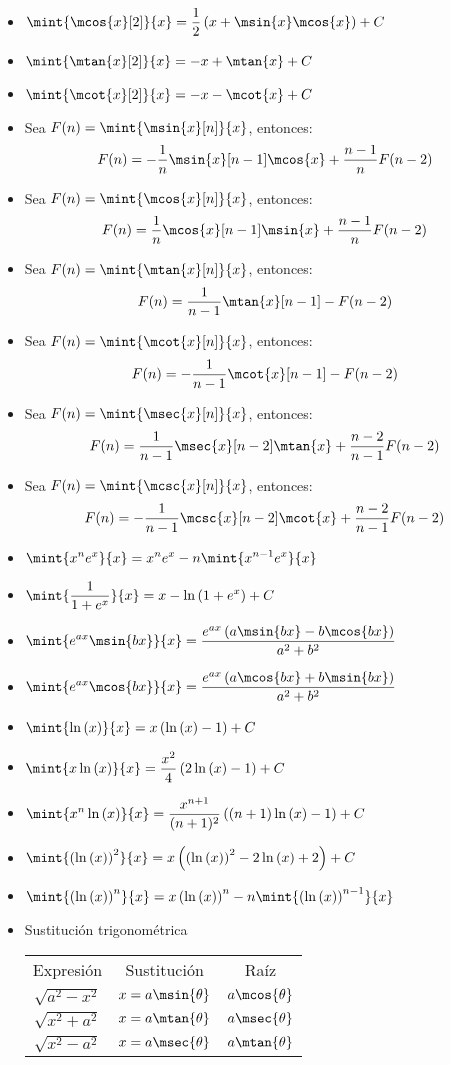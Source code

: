 \begin{itemize}
	\item $\ds\mint{\mcos{x}[2]}{x} =\dfrac{1}{2}\pa{x +\msin{x}\mcos{x}} + C$
	\item $\ds\mint{\mtan{x}[2]}{x} =-x +\mtan{x} + C$
	\item $\ds\mint{\mcot{x}[2]}{x} =-x -\mcot{x} + C$
	\item Sea $\ds F(n) =\mint{\msin{x}[n]}{x}$, entonces:
	\[ F(n) = -\frac{1}{n}\msin{x}[n - 1]\mcos{x} +\frac{n - 1}{n}F(n - 2) \]
	\item Sea $\ds F(n) =\mint{\mcos{x}[n]}{x}$, entonces:
	\[ F(n) =\frac{1}{n}\mcos{x}[n - 1]\msin{x} +\frac{n - 1}{n}F(n - 2) \]
	\item Sea $\ds F(n) =\mint{\mtan{x}[n]}{x}$, entonces:
	\[ F(n) =\dfrac{1}{n - 1}\mtan{x}[n - 1] - F(n - 2) \]
	\item Sea $\ds F(n) =\mint{\mcot{x}[n]}{x}$, entonces:
	\[ F(n) = -\dfrac{1}{n - 1}\mcot{x}[n - 1] - F(n - 2) \]
	\item Sea $\ds F(n) =\mint{\msec{x}[n]}{x}$, entonces:
	\[ F(n) =\dfrac{1}{n - 1}\msec{x}[n - 2]\mtan{x} +\dfrac{n - 2}{n - 1}F(n - 2) \]
	\item Sea $\ds F(n) =\mint{\mcsc{x}[n]}{x}$, entonces:
	\[ F(n) = -\dfrac{1}{n - 1}\mcsc{x}[n - 2]\mcot{x} +\dfrac{n - 2}{n - 1}F(n - 2) \]
	\item $\ds\mint{x^{n}e^{x}}{x} =x^{n}e^{x} - n\mint{x^{n - 1}e^{x}}{x}$
	\item $\ds\mint{\dfrac{1}{1 + e^{x}}}{x} = x -\mln{1 + e^{x}} + C$
	\item $\ds\mint{e^{ax}\msin{bx}}{x} =\dfrac{e^{ax}\pa{a\msin{bx} - b\mcos{bx}}}{a^{2} + b^{2}}$
	\item $\ds\mint{e^{ax}\mcos{bx}}{x} =\dfrac{e^{ax}\pa{a\mcos{bx} + b\msin{bx}}}{a^{2} + b^{2}}$
	\item $\ds\mint{\mln{x}}{x} =x\pa{\mln{x} - 1} + C$
	\item $\ds\mint{x\mln{x}}{x} =\dfrac{x^{2}}{4}\pa{2\mln{x} - 1} + C$
	\item $\ds\mint{x^{n}\mln{x}}{x} =\dfrac{x^{n + 1}}{(n + 1)^{2}}\pa{(n + 1)\mln{x} - 1} + C$
	\item $\ds\mint{\pa{\mln{x}}^{2}}{x} =x\pa{\pa{\mln{x}}^{2} - 2\mln{x} + 2} + C$
	\item $\ds\mint{\pa{\mln{x}}^{n}}{x} =x\pa{\mln{x}}^{n} - n\mint{\pa{\mln{x}}^{n - 1}}{x}$
	\item Sustitución trigonométrica
	\begin{table}[H]
		\centering
		\begin{tabular}{ccc}
			Expresión & Sustitución & Raíz \\
			$\sqrt{a^{2} - x^{2}}$ & $x = a\msin{\theta}$ & $a\mcos{\theta}$ \\
			$\sqrt{x^{2} + a^{2}}$ & $x = a\mtan{\theta}$ & $a\msec{\theta}$ \\
			$\sqrt{x^{2} - a^{2}}$ & $x = a\msec{\theta}$ & $a\mtan{\theta}$
		\end{tabular}
	\end{table}
\end{itemize}

